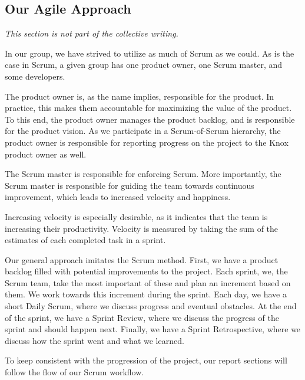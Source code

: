 \subsection{Our Agile Approach}\label{our_agile_approach}
\textit{This section is not part of the collective writing.}

In our group, we have strived to utilize as much of Scrum as we could.
As is the case in Scrum, a given group has one product owner, one Scrum master, and some developers\cite{sutherlandScrumArtDoing2014}.

The product owner is, as the name implies, responsible for the product. In practice, this makes them accountable for maximizing the value of the product. To this end, the product owner manages the product backlog, and is responsible for the product vision. As we participate in a Scrum-of-Scrum hierarchy, the product owner is responsible for reporting progress on the project to the Knox product owner as well\cite{sutherlandScrumArtDoing2014}.

The Scrum master is responsible for enforcing Scrum. More importantly, the Scrum master is responsible for guiding the team towards continuous improvement, which leads to increased velocity and happiness\cite{sutherlandScrumArtDoing2014}.

Increasing velocity is especially desirable, as it indicates that the team is increasing their productivity. Velocity is measured by taking the sum of the estimates of each completed task in a sprint\cite{sutherlandScrumArtDoing2014}. 

Our general approach imitates the Scrum method. First, we have a product backlog filled with potential improvements to the project. Each sprint, we, the Scrum team, take the most important of these and plan an increment based on them. We work towards this increment during the sprint. Each day, we have a short Daily Scrum, where we discuss progress and eventual obstacles. At the end of the sprint, we have a Sprint Review, where we discuss the progress of the sprint and should happen next. Finally, we have a Sprint Retrospective, where we discuss how the sprint went and what we learned.

To keep consistent with the progression of the project, our report sections will follow the flow of our Scrum workflow.